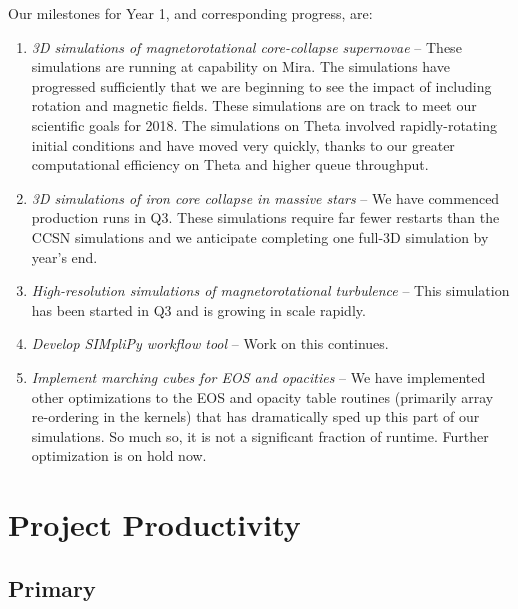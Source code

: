 \documentclass[12pt,titlepage]{article}
\begin{document}
Our milestones for Year 1, and corresponding progress, are:
\begin{enumerate}
  \item {\it 3D simulations of magnetorotational core-collapse supernovae} -- These simulations are running at capability on Mira. The simulations have progressed sufficiently that we are beginning to see the impact of including rotation and magnetic fields. These simulations are on track to meet our scientific goals for 2018. The simulations on Theta involved rapidly-rotating initial conditions and have moved very quickly, thanks to our greater computational efficiency on Theta and higher queue throughput.
  \item {\it 3D simulations of iron core collapse in massive stars} -- We have commenced production runs in Q3. These simulations require far fewer restarts than the CCSN simulations and we anticipate completing one full-3D simulation by year's end.
  \item {\it High-resolution simulations of magnetorotational turbulence} -- This simulation has been started in Q3 and is growing in scale rapidly.
  \item {\it Develop SIMpliPy workflow tool} -- Work on this continues. 
  \item {\it Implement marching cubes for EOS and opacities} -- We have implemented other optimizations to the EOS and opacity table routines (primarily array re-ordering in the kernels) that has dramatically sped up this part of our simulations. So much so, it is not a significant fraction of runtime. Further optimization is on hold now.
\end{enumerate}



\section{Project Productivity}

\subsection{Primary}
\end{document}
